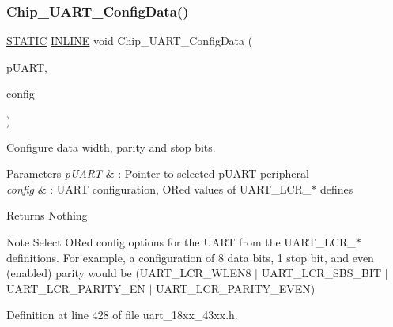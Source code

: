 \subsubsection{\texorpdfstring{Chip\+\_\+\+U\+A\+R\+T\+\_\+\+Config\+Data()}{Chip\_UART\_ConfigData()}}
{\footnotesize\ttfamily \hyperlink{group___l_p_c___types___public___macros_ga10b2d890d871e1489bb02b7e70d9bdfb}{S\+T\+A\+T\+IC} \hyperlink{spifi__18xx__43xx_8h_a2eb6f9e0395b47b8d5e3eeae4fe0c116}{I\+N\+L\+I\+NE} void Chip\+\_\+\+U\+A\+R\+T\+\_\+\+Config\+Data (\begin{DoxyParamCaption}\item[{\hyperlink{struct_l_p_c___u_s_a_r_t___t}{L\+P\+C\+\_\+\+U\+S\+A\+R\+T\+\_\+T} $\ast$}]{p\+U\+A\+RT,  }\item[{uint32\+\_\+t}]{config }\end{DoxyParamCaption})}



Configure data width, parity and stop bits. 


\begin{DoxyParams}{Parameters}
{\em p\+U\+A\+RT} & \+: Pointer to selected p\+U\+A\+RT peripheral \\
\hline
{\em config} & \+: U\+A\+RT configuration, OR\textquotesingle{}ed values of U\+A\+R\+T\+\_\+\+L\+C\+R\+\_\+$\ast$ defines \\
\hline
\end{DoxyParams}
\begin{DoxyReturn}{Returns}
Nothing 
\end{DoxyReturn}
\begin{DoxyNote}{Note}
Select OR\textquotesingle{}ed config options for the U\+A\+RT from the U\+A\+R\+T\+\_\+\+L\+C\+R\+\_\+$\ast$ definitions. For example, a configuration of 8 data bits, 1 stop bit, and even (enabled) parity would be (U\+A\+R\+T\+\_\+\+L\+C\+R\+\_\+\+W\+L\+E\+N8 $\vert$ U\+A\+R\+T\+\_\+\+L\+C\+R\+\_\+\+S\+B\+S\+\_\+B\+IT $\vert$ U\+A\+R\+T\+\_\+\+L\+C\+R\+\_\+\+P\+A\+R\+I\+T\+Y\+\_\+\+EN $\vert$ U\+A\+R\+T\+\_\+\+L\+C\+R\+\_\+\+P\+A\+R\+I\+T\+Y\+\_\+\+E\+V\+EN) 
\end{DoxyNote}


Definition at line 428 of file uart\+\_\+18xx\+\_\+43xx.\+h.

\mbox{\label{group___u_a_r_t__18_x_x__43_x_x_gaa18c4ebd4be27643e6f848472e778989}} 
